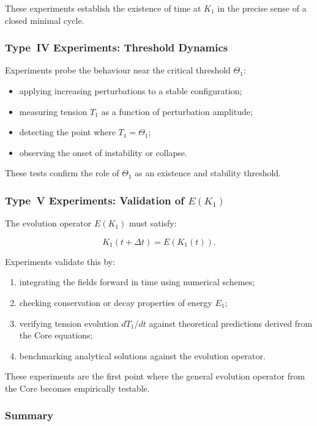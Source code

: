 These experiments establish the existence of time at $K_1$ in the precise
sense of a closed minimal cycle.


\subsubsection{Type~IV Experiments: Threshold Dynamics}

Experiments probe the behaviour near the critical threshold $\Theta_1$:

\begin{itemize}
    \item applying increasing perturbations to a stable configuration;
    \item measuring tension $T_1$ as a function of perturbation amplitude;
    \item detecting the point where $T_1 = \Theta_1$;
    \item observing the onset of instability or collapse.
\end{itemize}

These tests confirm the role of $\Theta_1$ as an existence and stability
threshold.


\subsubsection{Type~V Experiments: Validation of \texorpdfstring{$E(K_1)$}{E(K_1)}}

The evolution operator $E(K_1)$ must satisfy:

\[
    K_1(t+\Delta t) = E(K_1(t)).
\]

Experiments validate this by:

\begin{enumerate}
    \item integrating the fields forward in time using numerical schemes;
    \item checking conservation or decay properties of energy $E_1$;
    \item verifying tension evolution $dT_1/dt$ against theoretical 
          predictions derived from the Core equations;
    \item benchmarking analytical solutions against the evolution operator.
\end{enumerate}

These experiments are the first point where the general evolution operator
from the Core becomes empirically testable.


\subsubsection{Summary}

